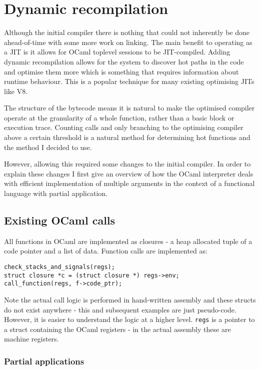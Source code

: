 \section{Dynamic recompilation} \label{dyn-recomp}

Although the initial compiler there is nothing that could not inherently be done ahead-of-time with
some more work on linking. The main benefit to operating as a JIT is it allows for OCaml toplevel
sessions to be JIT-compiled. Adding dynamic recompilation allows for the system to discover hot
paths in the code and optimise them more which is something that requires information about runtime
behaviour. This is a popular technique for many existing optimising JITs like V8.

The structure of the bytecode means it is natural to make the optimised compiler operate at the
granularity of a whole function, rather than a basic block or execution trace. Counting calls and
only branching to the optimising compiler above a certain threshold is a natural method for
determining hot functions and the method I decided to use.

However, allowing this required some changes to the initial compiler. In order to explain these
changes I first give an overview of how the OCaml interpreter deals with efficient
implementation of multiple arguments in the context of a functional language with partial
application.

\subsection{Existing OCaml calls} \label{exist-ocaml}

All functions in OCaml are implemented as closures - a heap allocated tuple of a code pointer and a
list of data. Function calls are implemented as:

\begin{verbatim}
check_stacks_and_signals(regs);
struct closure *c = (struct closure *) regs->env;
call_function(regs, f->code_ptr);
\end{verbatim}

Note the actual call logic is performed in hand-written assembly and these structs do not exist
anywhere
- this and subsequent examples are just pseudo-code. However, it is easier to understand the logic
at a higher level. \texttt{regs} is a pointer to a struct containing the OCaml registers - in the
actual assembly these are machine registers.

\subsubsection{Partial applications}

